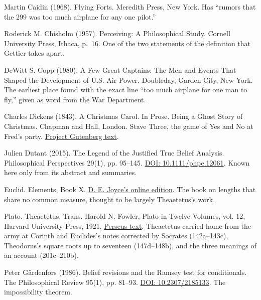 \documentclass[11pt,twoside]{article}
\theoremstyle{thielethm}
\theoremstyle{thieledef}
\theoremstyle{thieledef}
\theoremstyle{thieledef}
\theoremstyle{thielethm}
\theoremstyle{thieleobs}
\theoremstyle{thielethm}
\begin{document}
\noindent Martin Caidin (1968). Flying Forts. Meredith Press, New York. Has ``rumors that the 299 was too much airplane for any one pilot.''
\par\medskip

\noindent Roderick M. Chisholm (1957). Perceiving: A Philosophical Study. Cornell University Press, Ithaca, p.~16. One of the two statements of the definition that Gettier takes apart.
\par\medskip

\noindent DeWitt S. Copp (1980). A Few Great Captains: The Men and Events That Shaped the Development of U.S. Air Power. Doubleday, Garden City, New York. The earliest place found with the exact line ``too much airplane for one man to fly,'' given as word from the War Department.
\par\medskip

\noindent Charles Dickens (1843). A Christmas Carol. In Prose. Being a Ghost Story of Christmas. Chapman and Hall, London. Stave Three, the game of Yes and No at Fred's party. \href{https://www.gutenberg.org/ebooks/46}{Project Gutenberg text}.
\par\medskip

\noindent Julien Dutant (2015). The Legend of the Justified True Belief Analysis. Philosophical Perspectives 29(1), pp. 95--145. \href{https://doi.org/10.1111/phpe.12061}{DOI: 10.1111/phpe.12061}. Known here only from its abstract and summaries.
\par\medskip

\noindent Euclid. Elements, Book X. \href{https://mathcs.clarku.edu/~djoyce/elements/bookX/bookX.html}{D. E. Joyce's online edition}. The book on lengths that share no common measure, thought to be largely Theaetetus's work.
\par\medskip

\noindent Plato. Theaetetus. Trans. Harold N. Fowler, Plato in Twelve Volumes, vol. 12, Harvard University Press, 1921. \href{http://www.perseus.tufts.edu/hopper/text?doc=Perseus:text:1999.01.0172}{Perseus text}. Theaetetus carried home from the army at Corinth and Euclides's notes corrected by Socrates (142a--143c), Theodorus's square roots up to seventeen (147d--148b), and the three meanings of an account (201c--210b).
\par\medskip

\noindent Peter G\"ardenfors (1986). Belief revisions and the Ramsey test for conditionals. The Philosophical Review 95(1), pp. 81--93. \href{https://doi.org/10.2307/2185133}{DOI: 10.2307/2185133}. The impossibility theorem.
\par\medskip
\end{document}
